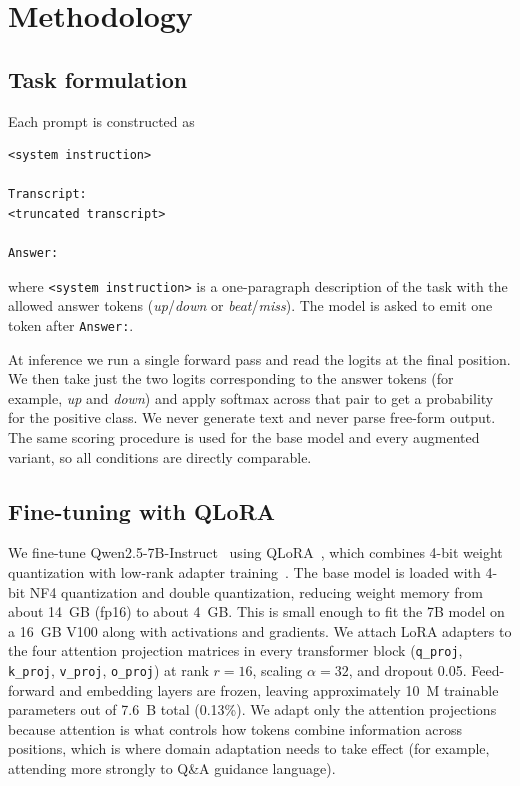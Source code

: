 \documentclass[11pt]{article}
\begin{document}
\section{Methodology}

\subsection{Task formulation}
\label{sec:formulation}

Each prompt is constructed as
\begin{verbatim}
<system instruction>

Transcript:
<truncated transcript>

Answer:
\end{verbatim}
where \texttt{<system instruction>} is a one-paragraph description of
the task with the allowed answer tokens (\emph{up}/\emph{down} or
\emph{beat}/\emph{miss}). The model is asked to emit one token after
\texttt{Answer:}.

At inference we run a single forward pass and read the logits at
the final position. We then take just the two logits corresponding
to the answer tokens (for example, \emph{up} and \emph{down}) and
apply softmax across that pair to get a probability for the positive
class. We never generate text and never parse free-form output. The
same scoring procedure is used for the base model and every
augmented variant, so all conditions are directly comparable.

\subsection{Fine-tuning with QLoRA}
\label{sec:finetune}

We fine-tune Qwen2.5-7B-Instruct~\citep{Qwen25} using
QLoRA~\citep{Dettmers2023}, which combines 4-bit weight quantization
with low-rank adapter training~\citep{Hu2022}. The base model is
loaded with 4-bit NF4 quantization and double quantization, reducing
weight memory from about 14~GB (fp16) to about 4~GB. This is small
enough to fit the 7B model on a 16~GB V100 along with activations
and gradients. We attach LoRA adapters to the four attention
projection matrices in every transformer block (\texttt{q\_proj},
\texttt{k\_proj}, \texttt{v\_proj}, \texttt{o\_proj}) at rank
$r=16$, scaling $\alpha=32$, and dropout 0.05. Feed-forward and
embedding layers are frozen, leaving approximately 10~M trainable
parameters out of 7.6~B total (0.13\%). We adapt only the attention
projections because attention is what controls how tokens combine
information across positions, which is where domain adaptation needs
to take effect (for example, attending more strongly to Q\&A
guidance language).
\end{document}
